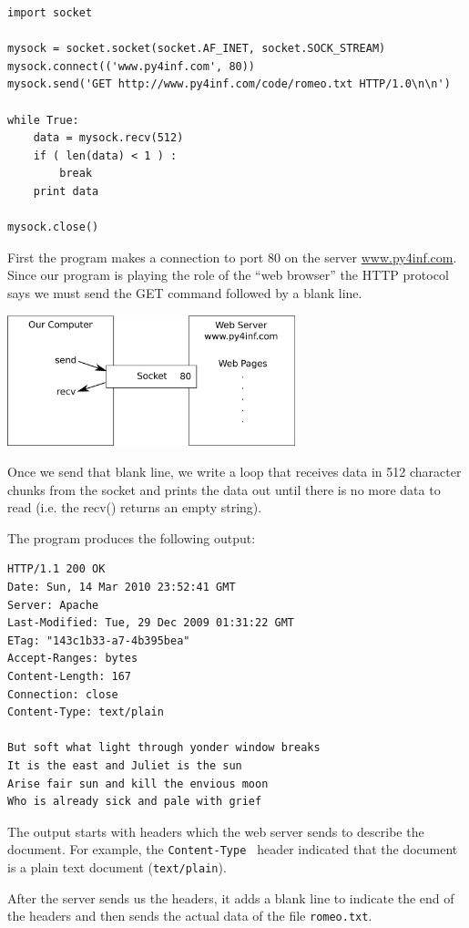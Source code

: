 \documentclass[10pt]{book}
\begin{document}
\beforeverb
\begin{verbatim}
import socket

mysock = socket.socket(socket.AF_INET, socket.SOCK_STREAM)
mysock.connect(('www.py4inf.com', 80))
mysock.send('GET http://www.py4inf.com/code/romeo.txt HTTP/1.0\n\n')

while True:
    data = mysock.recv(512)
    if ( len(data) < 1 ) :
        break
    print data

mysock.close()
\end{verbatim}
\afterverb
%
First the program makes a connection to port 80 on 
the server \url{www.py4inf.com}.
Since our program is playing the role of the ``web browser'' the HTTP
protocol says we must send the GET command followed by a blank line.

\beforefig
\centerline{\includegraphics[height=1.50in]{figs2/socket.eps}}
\afterfig

Once we send that blank line, we write a loop that receives data 
in 512 character chunks from the socket and prints the data out 
until there is no more data to read (i.e. the recv() returns 
an empty string).

The program produces the following output:

\beforeverb
\begin{verbatim}
HTTP/1.1 200 OK
Date: Sun, 14 Mar 2010 23:52:41 GMT
Server: Apache
Last-Modified: Tue, 29 Dec 2009 01:31:22 GMT
ETag: "143c1b33-a7-4b395bea"
Accept-Ranges: bytes
Content-Length: 167
Connection: close
Content-Type: text/plain

But soft what light through yonder window breaks
It is the east and Juliet is the sun
Arise fair sun and kill the envious moon
Who is already sick and pale with grief
\end{verbatim}
\afterverb
%
The output starts with headers which the web server sends
to describe the document.
For example, the {\tt Content-Type } header indicated that
the document is a plain text document ({\tt text/plain}).

After the server sends us the headers, it adds a blank line
to indicate the end of the headers and then sends the actual
data of the file {\tt romeo.txt}.
\end{document}
